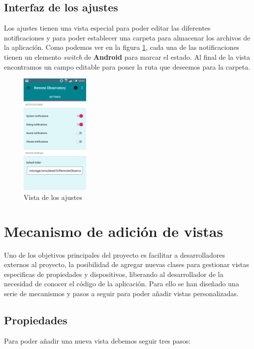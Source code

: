 \bigskip
\subsection{Interfaz de los ajustes}

Los ajustes tienen una vista especial para poder editar las diferentes notificaciones y para poder establecer una carpeta para almacenar los archivos de la aplicación. Como podemos ver en la figura \ref{fig:settings_view}, cada una de las notificaciones tienen un elemento \textit{switch} de \textbf{Android} para marcar el estado. Al final de la vista encontramos un campo editable para poner la ruta que deseemos para la carpeta.


\begin{figure}[!ht]
  \begin{center}
  \includegraphics[width=0.3\textwidth]{../images/settings2.png}
  \caption{Vista de los ajustes}
  \label{fig:settings_view}
  \end{center}
\end{figure}


\bigskip
\section{Mecanismo de adición de vistas}

Uno de los objetivos principales del proyecto es facilitar a desarrolladores externos al proyecto, la posibilidad de agregar nuevas clases para gestionar vistas especificas de propiedades y dispositivos, liberando al desarrollador de la necesidad de conocer el código de la aplicación. Para ello se han diseñado una serie de mecanismos y pasos a seguir para poder añadir vistas personalizadas.


\bigskip
\subsection{Propiedades}
Para poder añadir una nueva vista debemos seguir tres pasos:

